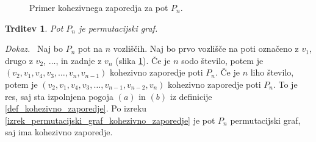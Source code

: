 \documentclass[a4paper, 12pt]{book}
\newtheorem{trditev}{Trditev}[chapter]
\newenvironment{dokaz}{\emph{Dokaz.}\ }{\hspace{\fill}{$\Box$}}
\begin{document}
\begin{figure}[h]
    \begin{center}        
    \end{center}
    \caption{Primer kohezivnega zaporedja za pot $P_n$.}
    \label{graf_kohezivnega_zaporedja_pot}
\end{figure}

\begin{trditev}
\label{trditev_pot_permutacijski_graf}
    Pot $P_n$ je permutacijski graf.
\end{trditev}
\begin{dokaz}
    Naj bo $P_n$ pot na $n$ vozliščih. Naj bo prvo vozlišče na poti označeno z $v_1$, drugo z $v_2$, $\dots$, in zadnje z $v_n$ (slika \ref{graf_kohezivnega_zaporedja_pot}). Če je $n$ sodo število, potem je $(v_2, v_1, v_4, v_3,\dots,v_{n}, v_{n-1})$ kohezivno zaporedje poti $P_n$. Če je $n$ liho število, potem je $(v_2, v_1, v_4, v_3,\dots,v_{n-1}, v_{n-2}, v_{n})$ kohezivno zaporedje poti $P_n$. To je res, saj sta izpolnjena pogoja $(a)$ in $(b)$ iz definicije \ref{def_kohezivno_zaporedje}. Po izreku \ref{izrek_permutacijski_graf_kohezivno_zaporedje} je pot $P_n$ permutacijski graf, saj ima kohezivno zaporedje.
\end{dokaz}
\end{document}
